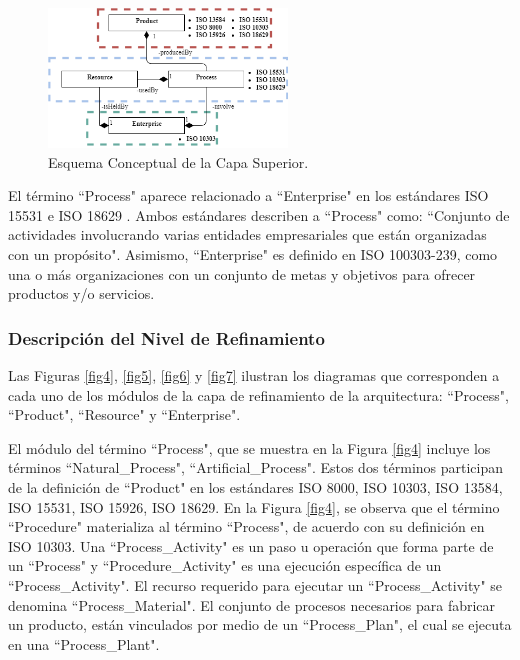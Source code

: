 \documentclass[journal]{IEEEtran}
\begin{document}
\begin{figure}[!t]
\centering
\includegraphics[width=2.5in]{figures/figure3.png}
\caption{Esquema Conceptual de la Capa Superior.}
\label{fig3}
\end{figure}

El t\'ermino ``Process" aparece relacionado a ``Enterprise" en los est\'andares ISO 15531 \cite{ISO2004} e ISO 18629 \cite{ISOPrinciplesc}. Ambos est\'andares describen a ``Process" como: ``Conjunto de actividades involucrando varias entidades empresariales que est\'an organizadas con un prop\'osito". Asimismo, ``Enterprise" es definido en ISO 100303-239, como una o m\'as organizaciones con un conjunto de metas y objetivos para ofrecer productos y/o servicios.

\subsubsection{Descripción del Nivel de Refinamiento}

Las Figuras \ref{fig4}, \ref{fig5}, \ref{fig6} y \ref{fig7} ilustran los diagramas que corresponden a cada uno de los m\'odulos de la capa de refinamiento de la arquitectura: ``Process", ``Product", ``Resource" y ``Enterprise". 

El m\'odulo del t\'ermino ``Process", que se muestra en la Figura \ref{fig4} incluye los t\'erminos ``Natural\_Process", ``Artificial\_Process". Estos dos t\'erminos participan de la definici\'on de ``Product" en los est\'andares ISO 8000, ISO 10303, ISO 13584, ISO 15531, ISO 15926, ISO 18629. En la Figura \ref{fig4}, se observa que el t\'ermino ``Procedure" materializa al t\'ermino ``Process", de acuerdo con su definici\'on en ISO 10303. Una ``Process\_Activity" es un paso u operaci\'on que forma parte de un ``Process" y ``Procedure\_Activity" es una ejecuci\'on espec\'ifica de un ``Process\_Activity". El recurso requerido para ejecutar un ``Process\_Activity" se denomina ``Process\_Material". El conjunto de procesos necesarios para fabricar un producto, est\'an vinculados por medio de un ``Process\_Plan", el cual se ejecuta en una ``Process\_Plant".
\end{document}
